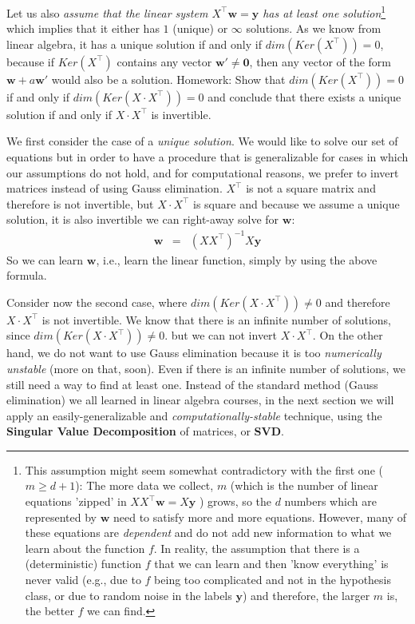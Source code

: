 \documentclass[11pt]{article}
\newcommand{\Tr}{\ensuremath{\top}}
\begin{document}
Let us also \textit{assume that the linear system $X^\Tr \mathbf{w}=\mathbf{y}$ has at least one solution}\footnote{This assumption might seem somewhat contradictory with the first one ($m\geq d+1$): The more data we collect, $m$ (which is the number of linear equations 'zipped' in $XX^\Tr \mathbf{w}=X\mathbf{y}$ ) grows, so the $d$ numbers which are represented by $\mathbf{w}$ need to satisfy more and more equations. However, many of these equations are \emph{dependent} and do not add new information to what we learn about the function $f$. In reality, the assumption that there is a (deterministic) function $f$ that we can learn and then 'know everything' is never valid (e.g., due to $f$ being too complicated and not in the hypothesis class, or due to random noise in the labels $\mathbf{y}$) and therefore, the larger $m$ is, the better $\hat{f}$ we can find.}
which implies that it either has $1$ (unique) or $\infty$ solutions. As we know from linear algebra, it has a unique solution if and only if $dim(Ker(X^\Tr))=0$, because if $Ker(X^\Tr)$ contains any vector $\mathbf{w}'\neq \mathbf{0}$, then any vector of the form $\mathbf{w}+a\mathbf{w}'$ would also be a solution.
\vspace{3mm}
Homework: Show that $dim(Ker(X^\Tr))=0$ if and only if $dim(Ker(X\cdot X^\Tr))=0$ and conclude that there exists a unique solution if and only if $X\cdot X^\Tr$ is invertible.
\vspace{3mm}


We first consider the case of a \textit{unique solution}. We would like to solve our set of equations but in order to have a procedure that is generalizable for cases in which our assumptions do not hold, and for computational reasons,  we prefer to invert matrices instead of using Gauss elimination.
$X^\Tr$ is not a square matrix and therefore is not invertible, but $X\cdot X^\Tr$ is square and because we assume a unique solution, it is also invertible we can right-away solve for $\mathbf{w}$:
\begin{eqnarray*}
  \mathbf{w} &=&  (X X^\Tr)^{-1}X\mathbf{y}
\end{eqnarray*}
So we can  learn $\mathbf{w}$, i.e., learn the linear function, simply by using the above formula.

Consider now the second case, where $dim(Ker(X\cdot X^\Tr))\neq 0$  and therefore $X\cdot X^\Tr$ is not invertible. We
 know that there is an infinite number of solutions,  since $dim(Ker(X\cdot X^\Tr))\neq 0$.
but we can not invert $X\cdot X^\Tr$. On the other hand, we do not want to use Gauss elimination because it is too \textit{numerically unstable} (more on that, soon).
Even if there is an infinite number of solutions, we still need a way to find at least one. Instead of the standard method (Gauss elimination) we all learned in linear algebra courses, in the next section we will apply an easily-generalizable and \textit{computationally-stable} technique, using the \textbf{Singular Value Decomposition} of matrices, or \textbf{SVD}.
\end{document}
